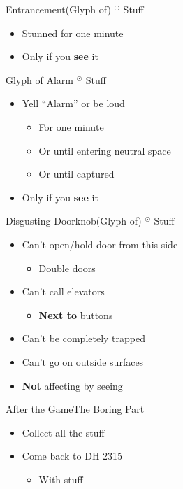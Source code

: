 \documentclass[17pt]{beamer}
\newcommand{\subitem}[1]{\begin{itemize} \item #1 \end{itemize}}
\newcommand{\sep}{ $^\odot$ }
\begin{document}
\begin{frame}{Entrancement}{(Glyph of) \sep Stuff}
  \begin{itemize}
  \item Stunned for one minute
  \item Only if you \textbf{see} it
  \end{itemize}
\end{frame}

\begin{frame}{Glyph of Alarm}{\sep Stuff}
  \begin{itemize}
  \item Yell ``Alarm'' or be loud
  \begin{itemize}
    \item For one minute
    \item Or until entering neutral space
    \item Or until captured
  \end{itemize}
  \item Only if you \textbf{see} it
  \end{itemize}
\end{frame}

\begin{frame}{Disgusting Doorknob}{(Glyph of) \sep Stuff}
  \begin{itemize}
  \item Can't open/hold door from this side
  \subitem{Double doors}
  \item Can't call elevators
  \subitem{\textbf{Next to} buttons}
  \item Can't be completely trapped
  \item Can't go on outside surfaces
  \item \textbf{Not} affecting by seeing
  \end{itemize}
\end{frame}

\begin{frame}{After the Game}{The Boring Part}
  \begin{itemize}
     \item Collect all the stuff
     \item Come back to DH 2315
     \subitem{With stuff}
   \end{itemize}
\end{frame}
\end{document}
